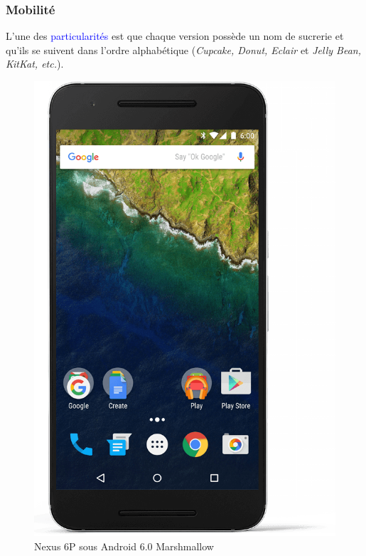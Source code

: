 \documentclass[aspectratio=169]{beamer}
\begin{document}
\begin{frame}
\frametitle{Mobilité}
 L'une des \textcolor{blue}{particularités} est que chaque version possède
 un nom de sucrerie et qu'ils se suivent dans l'ordre alphabétique
 (\textit{Cupcake, \textit{Donut}, Eclair} et \textit{Jelly Bean,
 KitKat, etc.}).

  \begin{figure}[!h]
    \centering
    \includegraphics[scale=0.15]
    {textures/images/unix/mobiles/nexus.png}
    \caption{Nexus 6P sous Android 6.0 Marshmallow}
  \end{figure}
\end{frame}
\end{document}
